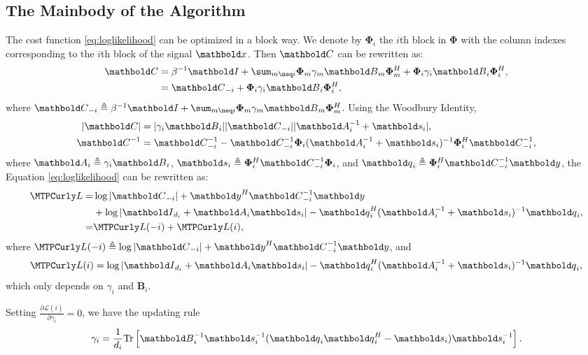 \subsection{The Mainbody of the Algorithm}
The cost function \eqref{eq:loglikelihood} can be optimized in a block way.
We denote by $\bm{\Phi}_i$
the $i$th block in $\bm{\Phi}$ with the column indexes  corresponding to
the $i$th block
of the signal $\ve{x}$. Then $\ve{C}$ can be rewritten as:
\begin{align}
\ve{C} &= \beta^{-1}\ve{I} + \sum_{m\neq i} \bm{\Phi}_m\gamma_m\ve{B}_m\bm{\Phi}_m^H+
\bm{\Phi}_i\gamma_i\ve{B}_i\bm{\Phi}_i^H, \\
 &= \ve{C}_{-i} + \bm{\Phi}_i\gamma_i\ve{B}_i\bm{\Phi}_i^H, \label{eq:c}
\end{align}
where $\ve{C}_{-i} \triangleq \beta^{-1}\ve{I} + \sum_{m\neq i} \bm{\Phi}_m\gamma_m\ve{B}_m\bm{\Phi}_m^H$.
Using the Woodbury Identity,
\begin{align}
\abs{\ve{C}} &= \abs{\gamma_i\ve{B}_i}\abs{\ve{C}_{-i}}\abs{\ve{A}_i^{-1} + \ve{s}_i}, \\
\ve{C}^{-1} &= \ve{C}_{-i}^{-1} - \ve{C}_{-i}^{-1}\bm{\Phi}_i(\ve{A}_i^{-1} + \ve{s}_i)^{-1}\bm{\Phi}_i^H\ve{C}_{-i}^{-1},
\end{align}
where $\ve{A}_i\triangleq\gamma_i\ve{B}_i$,
$\ve{s}_i\triangleq \bm{\Phi}_i^H\ve{C}_{-i}^{-1}\bm{\Phi}_i$, and
$\ve{q}_i\triangleq\bm{\Phi}_i^H\ve{C}_{-i}^{-1}\ve{y}$,
the Equation \eqref{eq:loglikelihood} can be rewritten as:
\begin{align}
\mathcal{L} =& \log\abs{\ve{C}_{-i}} + \ve{y}^H\ve{C}_{-i}^{-1}\ve{y} \nonumber \\
 &+ \log\abs{\ve{I}_{d_i} + \ve{A}_i\ve{s}_i} - \ve{q}_i^H(\ve{A}_i^{-1} + \ve{s}_i)^{-1}\ve{q}_i, \\
 =& \mathcal{L}(-i) + \mathcal{L}(i),
\end{align}
where $\mathcal{L}(-i) \triangleq \log\abs{\ve{C}_{-i}} + \ve{y}^H\ve{C}_{-i}^{-1}\ve{y}$, and
\begin{equation}\label{eq:lgi}
\mathcal{L}(i) =
\log\abs{\ve{I}_{d_i} + \ve{A}_i\ve{s}_i} -
\ve{q}_i^H(\ve{A}_i^{-1} + \ve{s}_i)^{-1}\ve{q}_i,
\end{equation}
which only depends on $\gamma_i$ and $\mathbf{B}_i$.

Setting  $\frac{\partial \mathcal{L}(i)}{\partial \gamma_i} = 0$, we have the updating rule
\begin{equation}\label{eq:gamma_0}
\gamma_i = \frac{1}{d_i}\mathrm{Tr}\left[\ve{B}_i^{-1}\ve{s}_i^{-1}(\ve{q}_i\ve{q}_i^H - \ve{s}_i)\ve{s}_i^{-1}\right].
\end{equation}

